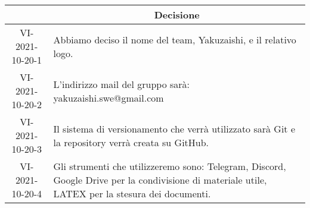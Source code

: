 \begin{table}[H]
	\centering
	\renewcommand{\arraystretch}{1.8}
	\begin{tabular}{c | p{8cm}}
		\rowcolor[HTML]{125e28}
		\multicolumn{1}{c}{\color[HTML]{FFFFFF} \textbf{ID}} &
		\multicolumn{1}{c}{\color[HTML]{FFFFFF} \textbf{Decisione}} \\
		\hline
		VI-2021-10-20-1 & Abbiamo deciso il nome del team, Yakuzaishi, e il relativo logo.  \\ \hline
		VI-2021-10-20-2 & L'indirizzo mail del gruppo sarà: yakuzaishi.swe@gmail.com \\ \hline
		VI-2021-10-20-3 & Il sistema di versionamento che verrà utilizzato sarà Git\glo{} e la repository\glo{} verrà creata su GitHub\glo{}.  \\ \hline
		VI-2021-10-20-4 & Gli strumenti che utilizzeremo sono: Telegram\glo{}, Discord\glo{}, Google Drive\glo{} per la condivisione di materiale utile, LATEX\glo{} per la stesura dei documenti.  \\
	\end{tabular}
\end{table}